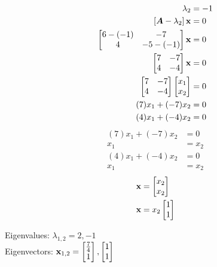 \documentclass{article}
\begin{document}
\begin{align*}
	\lambda_2 & = -1 \\
	\left[ \matr{A} - \lambda_2 \right] \vect{x} & = 0 \\
	\begin{bmatrix}
		6 - (-1) & -7 \\
		4 & -5 - (-1)
	\end{bmatrix} \vect{x} & = 0 \\
	\begin{bmatrix}
		7 & -7 \\
		4 & -4
	\end{bmatrix} \vect{x} & = 0 \\
	\begin{bmatrix} 7 & -7 \\ 4 & -4 \end{bmatrix}
	\begin{bmatrix} x_1 \\ x_2 \end{bmatrix} & = 0 \\
	(7)x_1 + (-7)x_2 & = 0 \\
	(4)x_1 + (-4)x_2 & = 0
\end{align*}
\begin{align*}
	(7)x_1 + (-7)x_2 & = 0 \\
	x_1 & = x_2
\end{align*}
\begin{align*}
	(4)x_1 + (-4)x_2 & = 0 \\
	x_1 & = x_2
\end{align*}
\begin{align*}
	\vect{x} & = \begin{bmatrix} x_2 \\ x_2 \end{bmatrix} \\
	\vect{x} & = x_2 \begin{bmatrix} 1 \\ 1 \end{bmatrix}
\end{align*}
\begin{mdframed}
	Eigenvalues: $ \lambda_{1,2} = 2, -1 $ \\
	Eigenvectors: $ \vect{x}_{1,2} = \begin{bmatrix} \frac{7}{4} \\ 1 \end{bmatrix}, \begin{bmatrix} 1 \\ 1 \end{bmatrix} $
\end{mdframed}
\end{document}
